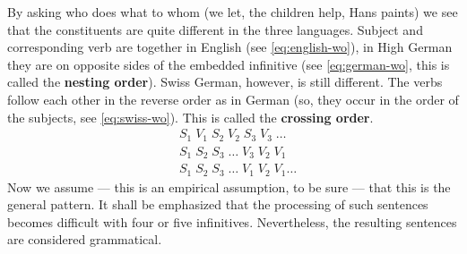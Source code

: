 By asking who does what to whom (we let, the children help, Hans
paints) we see that the constituents are quite different in the
three languages. Subject and corresponding verb are together in
English (see \eqref{eq:english-wo}), in High German they are on 
opposite sides of the embedded infinitive (see \eqref{eq:german-wo}, 
this is called the \textbf{nesting order}).
Swiss German, however, is still different. The verbs follow
each other in the reverse order as in German (so, they occur
in the order of the subjects, see \eqref{eq:swiss-wo}). This is 
called the \textbf{crossing order}.
\begin{subequations}
\begin{align}
\label{eq:english-wo}
& S_1\; V_1\; S_2\; V_2\; S_3\; V_3\; \dotso \\
\label{eq:german-wo}
& S_1\; S_2\; S_3\; \dotso\; V_3\; V_2\; V_1 \\
\label{eq:swiss-wo}
& S_1\; S_2\; S_3\; \dotso\; V_1\; V_2\; V_1\dotso  
\end{align}
\end{subequations}
Now we assume --- this is an empirical assumption, to be
sure --- that this is the general pattern. It shall be
emphasized that the processing of such sentences becomes
difficult with four or five infinitives. Nevertheless, the
resulting sentences are considered grammatical.

